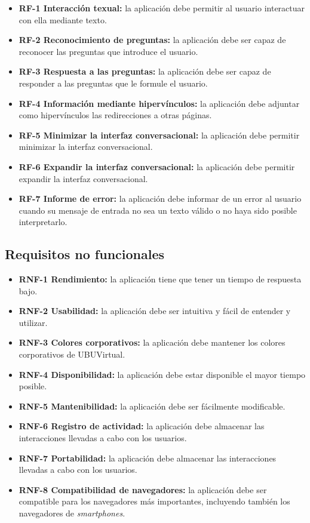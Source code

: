 \begin{itemize}
	\tightlist
	\item
	\textbf{RF-1 Interacción texual:} la aplicación debe permitir al usuario interactuar con ella mediante texto.
	\item
	\textbf{RF-2 Reconocimiento de preguntas:} la aplicación debe ser capaz de reconocer las preguntas que introduce el usuario.
	\item
	\textbf{RF-3 Respuesta a las preguntas:} la aplicación debe ser capaz de responder a las preguntas que le formule el usuario.
	\item
	\textbf{RF-4 Información mediante hipervínculos:} la aplicación debe adjuntar como hipervínculos las redirecciones a otras páginas.
	\item
	\textbf{RF-5 Minimizar la interfaz conversacional:} la aplicación debe permitir minimizar la interfaz conversacional.
	\item
	\textbf{RF-6 Expandir la interfaz conversacional:} la aplicación debe permitir expandir la interfaz conversacional.
	\item
	\textbf{RF-7 Informe de error:} la aplicación debe informar de un error al usuario cuando su mensaje de entrada no sea un texto válido o no haya sido posible interpretarlo. 
\end{itemize}


\subsection{Requisitos no funcionales}\label{requisitosNoFuncionales}

\begin{itemize}
	\tightlist
	\item
	\textbf{RNF-1 Rendimiento:} la aplicación tiene que tener un tiempo de respuesta bajo.  
	\item
	\textbf{RNF-2 Usabilidad:} la aplicación debe ser intuitiva y fácil de entender y utilizar.  
	\item
	\textbf{RNF-3 Colores corporativos:} la aplicación debe mantener los colores corporativos de UBUVirtual.  
	\item
	\textbf{RNF-4 Disponibilidad:} la aplicación debe estar disponible el mayor tiempo posible.
	\item
	\textbf{RNF-5 Mantenibilidad:} la aplicación debe ser fácilmente modificable.
	\item
	\textbf{RNF-6 Registro de actividad:} la aplicación debe almacenar las interacciones llevadas a cabo con los usuarios.
	\item
	\textbf{RNF-7 Portabilidad:} la aplicación debe almacenar las interacciones llevadas a cabo con los usuarios.
	\item
	\textbf{RNF-8 Compatibilidad de navegadores:} la aplicación debe ser compatible para los navegadores más importantes, incluyendo también los navegadores de \textit{smartphones}.
\end{itemize}


